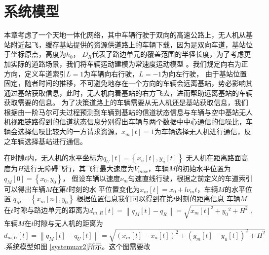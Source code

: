 \section{系统模型}\label{section4-2}
本章考虑了一个天地一体化网络，其中车辆行驶于双向的高速公路上，无人机从基站附近起飞，缓存基站提供的资源供道路上的车辆下载，因为是双向车道，基站位于坐标原点，高度为$h_0$，
$D_R$代表了路边单元的覆盖范围的半径长度，为了考虑更加实际的道路场景，我们将车辆运动建模为常速度运动模型 \cite{Fiore2008TheNS}。我们规定向右为正方向，定义车道索引$L=1$为车辆向右行驶，$L=-1$为向左行驶，
由于基站位置固定，随者时间的推移，不可避免地存在一个方向的车辆会远离基站，势必影响其通过基站获取信息，此时，无人机向着基站的右方飞去，进而帮助远离基站的车辆获取需要的信息。
为了决策道路上的车辆需要从无人机还是基站获取信息，我们根据由一阶马尔可夫过程预测到车辆到基站的信道状态信息与车辆与空中基站无人机视距链路得到的信道状态信息分别得出车辆与两个数据中中心通信的信噪比，车辆会选择信噪比较大的一方请求资源，$x_m\left[t\right]=1$为车辆选择无人机进行通信，反之车辆选择基站进行通信。

在时隙$t$内，无人机的水平坐标为$q_U\left[t\right]=\left\{x_u\left[t\right],y_u\left[t\right]\right\}$
无人机在距离路面高度为$H$进行无障碍飞行，其飞行最大速度为$V_{max}$，车辆$M$的初始水平位置为$q_M\left[0\right]=\left\{x_0,y_0\right\}$，
假设车辆以速度$\nu_m$匀速直线行驶，根据之前定义的车道索引可以得出车辆$M$在第$t$时刻的水
平位置变化为$x_m\left[t\right]=x_0+l\nu_m t$，车辆$M$的水平位置 $q_M=\left\{x_m\left[n\right],y_0\right\}$
根据位置信息我们可以得到在第$t$时刻的距离信息
车辆$M$在$t$时隙与路边单元的距离为${{d}_{m,R}}\left[ t \right]=\left\| {{q}_{M}}\left[ t \right]-{{q}_{R}} \right\|=\sqrt{{{x}_{m}}{{\left[ t \right]}^{2}}+{{y}_{0}}^{2}+{{H}^{2}}}$
,车辆$M$在$t$时隙与无人机的距离为
$
{{d}_{m,U}}\left[ t \right]=\left\| {{q}_{M}}\left[ t \right]-{{q}_{U}}\left[ t \right] \right\|=\sqrt{{{\left( {{x}_{m}}\left[ t \right]-{{x}_{u}}\left[ t \right] \right)}^{2}}+{{\left( {{y}_{m}}\left[ t \right]-{{y}_{u}}\left[ t \right] \right)}^{2}}+{{H}^{2}}}\
$.系统模型如图 \ref{systemuav2}所示。\textcolor[RGB]{18,220,168}{这个图需要改}

